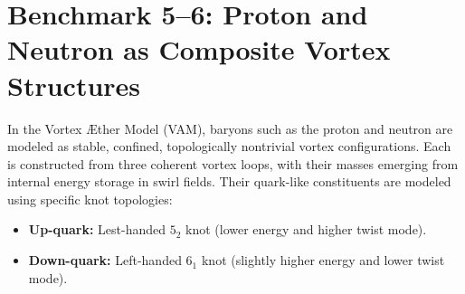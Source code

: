 \section{Benchmark 5--6: Proton and Neutron as Composite Vortex Structures}

In the Vortex \AE ther Model (VAM), baryons such as the proton and neutron are modeled as stable, confined, topologically nontrivial vortex configurations. Each is constructed from three coherent vortex loops, with their masses emerging from internal energy storage in swirl fields. Their quark-like constituents are modeled using specific knot topologies:

\begin{itemize}
    \item \textbf{Up-quark:} Lest-handed \( 5_2 \) knot (lower energy and higher twist mode).
    \item \textbf{Down-quark:} Left-handed \( 6_1 \) knot (slightly higher energy and lower twist mode).
\end{itemize}

